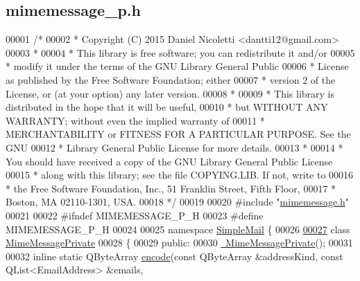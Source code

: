 \hypertarget{mimemessage__p_8h_source}{}\subsection{mimemessage\+\_\+p.\+h}
\label{mimemessage__p_8h_source}

\begin{DoxyCode}
00001 \textcolor{comment}{/*}
00002 \textcolor{comment}{ * Copyright (C) 2015 Daniel Nicoletti <dantti12@gmail.com>}
00003 \textcolor{comment}{ *}
00004 \textcolor{comment}{ * This library is free software; you can redistribute it and/or}
00005 \textcolor{comment}{ * modify it under the terms of the GNU Library General Public}
00006 \textcolor{comment}{ * License as published by the Free Software Foundation; either}
00007 \textcolor{comment}{ * version 2 of the License, or (at your option) any later version.}
00008 \textcolor{comment}{ *}
00009 \textcolor{comment}{ * This library is distributed in the hope that it will be useful,}
00010 \textcolor{comment}{ * but WITHOUT ANY WARRANTY; without even the implied warranty of}
00011 \textcolor{comment}{ *  MERCHANTABILITY or FITNESS FOR A PARTICULAR PURPOSE. See the GNU}
00012 \textcolor{comment}{ * Library General Public License for more details.}
00013 \textcolor{comment}{ *}
00014 \textcolor{comment}{ * You should have received a copy of the GNU Library General Public License}
00015 \textcolor{comment}{ * along with this library; see the file COPYING.LIB. If not, write to}
00016 \textcolor{comment}{ * the Free Software Foundation, Inc., 51 Franklin Street, Fifth Floor,}
00017 \textcolor{comment}{ * Boston, MA 02110-1301, USA.}
00018 \textcolor{comment}{ */}
00019 
00020 \textcolor{preprocessor}{#include "\hyperlink{mimemessage_8h}{mimemessage.h}"}
00021 
00022 \textcolor{preprocessor}{#ifndef MIMEMESSAGE\_P\_H}
00023 \textcolor{preprocessor}{#define MIMEMESSAGE\_P\_H}
00024 
00025 \textcolor{keyword}{namespace }\hyperlink{namespace_simple_mail}{SimpleMail} \{
00026 
\hyperlink{class_simple_mail_1_1_mime_message_private}{00027} \textcolor{keyword}{class }\hyperlink{class_simple_mail_1_1_mime_message_private}{MimeMessagePrivate}
00028 \{
00029 \textcolor{keyword}{public}:
00030     \hyperlink{class_simple_mail_1_1_mime_message_private_a93ed259a5e3be9645688f2887f5559ed}{~MimeMessagePrivate}();
00031 
00032     \textcolor{keyword}{inline} \textcolor{keyword}{static} QByteArray \hyperlink{class_simple_mail_1_1_mime_message_private_a44bd454950e1fd6b48a29d2a7b11ca33}{encode}(\textcolor{keyword}{const} QByteArray &addressKind, \textcolor{keyword}{const} QList<EmailAddress> &emails,

\end{DoxyCode}
